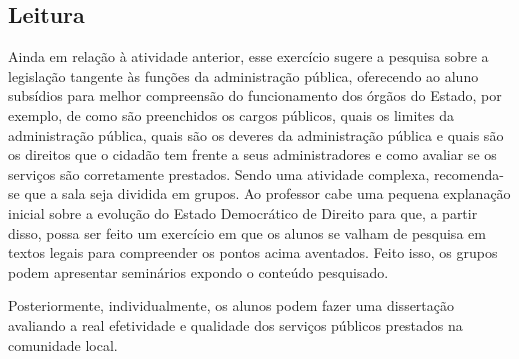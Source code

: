 \documentclass[12pt]{extarticle}
\begin{document}
\subsection{Leitura}


Ainda em relação à atividade anterior, esse exercício sugere
a pesquisa sobre a legislação tangente às funções da administração
pública, oferecendo ao aluno subsídios para melhor compreensão do
funcionamento dos órgãos do Estado, por exemplo, de como são preenchidos
os cargos públicos, quais os limites da administração pública, quais são
os deveres da administração pública e quais são os direitos que o
cidadão tem frente a seus administradores e como avaliar se os serviços
são corretamente prestados. Sendo uma atividade complexa, recomenda-se
que a sala seja dividida em grupos. Ao professor cabe uma pequena
explanação inicial sobre a evolução do Estado Democrático de Direito
para que, a partir disso, possa ser feito um exercício em que os alunos
se valham de pesquisa em textos legais para compreender os pontos acima
aventados. Feito isso, os grupos podem apresentar seminários expondo o
conteúdo pesquisado.

Posteriormente, individualmente, os alunos podem fazer uma dissertação
avaliando a real efetividade e qualidade dos serviços públicos prestados
na comunidade local.
\end{document}
